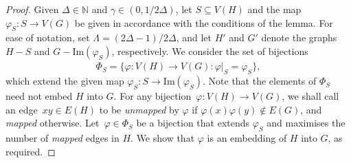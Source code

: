 \documentclass[final]{article}
\theoremstyle{definition}
\newcommand{\im}{\mathrm{Im}}
\begin{document}
\begin{proof}
    Given $\Delta \in \mathbb{N}$ and $\gamma \in (0, 1/2\Delta)$, let $S \subseteq V(H)$ and the map~$\varphi_S : S \to V(G)$ be given in accordance with the conditions of the lemma. 
    For ease of notation, set $\Lambda = (2\Delta - 1)/2\Delta$, and let $H'$ and $G'$ denote the graphs $H - S$ and $G - \im(\varphi_S)$, respectively. 
    We consider the set of bijections $$\Phi_S = \bigl\{\varphi : V(H) \to V(G) : \varphi|^{\phantom0}_S = \varphi_S\bigr\},$$ 
    which extend the given map $\varphi_S: S \to \im(\varphi_S)$. Note that the elements of $\Phi_S$ need not embed $H$ into $G$. 
    For any bijection~$\varphi: V(H) \to V(G)$, we shall call an edge~$xy \in E(H)$ to be \emph{unmapped} by $\varphi$ if $\varphi(x)\varphi(y) \notin E(G)$, and \emph{mapped} otherwise. 
    Let~$\varphi \in \Phi_S$ be a bijection that extends $\varphi_S$ and maximises the number of \emph{mapped} edges in $H$. 
    We show that $\varphi$ is an embedding of $H$ into $G$, as required.


\end{proof}
\end{document}
